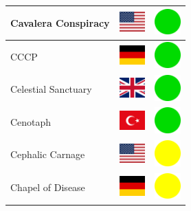 \documentclass[12pt, a4paper, twoside]{report}
\begin{document}
\begin{center}
\begin{longtable}{|p{5cm}|p{2cm}|p{2cm}|}
 Cavalera Conspiracy                                        & \includegraphics[width=1cm]{../img/flags/us} &   \includegraphics[width=1cm]{../likes/y} \\ \hline
 CCCP                                                       & \includegraphics[width=1cm]{../img/flags/de} &   \includegraphics[width=1cm]{../likes/y} \\ \hline
 Celestial Sanctuary                                        & \includegraphics[width=1cm]{../img/flags/gb} &   \includegraphics[width=1cm]{../likes/y} \\ \hline
 Cenotaph                                                   & \includegraphics[width=1cm]{../img/flags/tr} &   \includegraphics[width=1cm]{../likes/y} \\ \hline
 Cephalic Carnage                                           & \includegraphics[width=1cm]{../img/flags/us} &   \includegraphics[width=1cm]{../likes/m} \\ \hline
 Chapel of Disease                                          & \includegraphics[width=1cm]{../img/flags/de} &   \includegraphics[width=1cm]{../likes/m} \\ \hline

\end{longtable}
\end{center}
\end{document}
